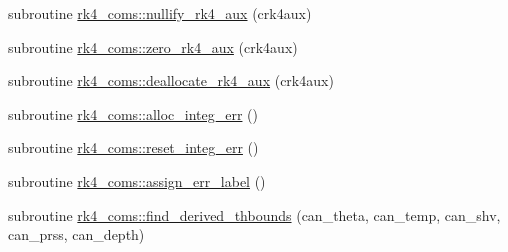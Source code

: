 \begin{DoxyCompactItemize}
subroutine \hyperlink{namespacerk4__coms_a306ba21ba388b2e51767aa9f5d76eda0}{rk4\+\_\+coms\+::nullify\+\_\+rk4\+\_\+aux} (crk4aux)
\item 
subroutine \hyperlink{namespacerk4__coms_a0af8d3f6d5452c98c81c5230f3b22343}{rk4\+\_\+coms\+::zero\+\_\+rk4\+\_\+aux} (crk4aux)
\item 
subroutine \hyperlink{namespacerk4__coms_a5af13b35af38a83aed0e367f7053ffc3}{rk4\+\_\+coms\+::deallocate\+\_\+rk4\+\_\+aux} (crk4aux)
\item 
subroutine \hyperlink{namespacerk4__coms_a8266a2612a37eea2fc3106633e25f954}{rk4\+\_\+coms\+::alloc\+\_\+integ\+\_\+err} ()
\item 
subroutine \hyperlink{namespacerk4__coms_aa58f2e011f087e610d94022bed90be7a}{rk4\+\_\+coms\+::reset\+\_\+integ\+\_\+err} ()
\item 
subroutine \hyperlink{namespacerk4__coms_ae49c70a18c8dfa81befa51bc5244ab8c}{rk4\+\_\+coms\+::assign\+\_\+err\+\_\+label} ()
\item 
subroutine \hyperlink{namespacerk4__coms_a14cd925b1b96d3da7c3b74351101e997}{rk4\+\_\+coms\+::find\+\_\+derived\+\_\+thbounds} (can\+\_\+theta, can\+\_\+temp, can\+\_\+shv, can\+\_\+prss, can\+\_\+depth)
\end{DoxyCompactItemize}
